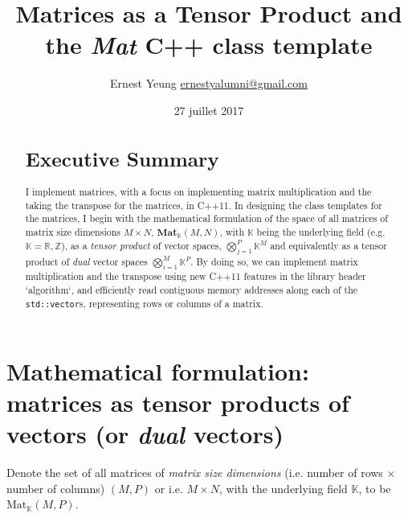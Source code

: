 \documentclass[10pt]{amsart}
\title[Matrices as a Tensor Product and the \emph{Mat} C++ class template]{Matrices as a Tensor Product and the \emph{Mat} C++ class template}
\author{Ernest Yeung \href{mailto:ernestyalumni@gmail.com}{ernestyalumni@gmail.com}}
\date{27 juillet 2017}
\begin{document}

\maketitle

\tableofcontents



 











\begin{abstract}
\section{Executive Summary}

I implement matrices, with a focus on implementing matrix multiplication and the taking the transpose for the matrices, in C++11.  In designing the class templates for the matrices, I begin with the mathematical formulation of the space of all matrices of matrix size dimensions $M\times N$, $\textbf{Mat}_{\mathbb{K}}(M,N)$, with $\mathbb{K}$ being the underlying field (e.g. $\mathbb{K}=\mathbb{R},\mathbb{Z}$), as a \emph{tensor product} of vector spaces,  $\bigotimes_{j=1}^P \mathbb{K}^M$ and equivalently as a tensor product of \emph{dual} vector spaces $\bigotimes_{i=1}^M \mathbb{K}^P$.  By doing so, we can implement matrix multiplication and the transpose using new C++11 features in the library header `algorithm`, and efficiently read contiguous memory addresses along each of the \verb|std::vector|s, representing rows or columns of a matrix.  
\end{abstract}

\section{Mathematical formulation: matrices as tensor products of vectors (or \emph{dual} vectors)}

Denote the set of all matrices of \emph{matrix size dimensions} (i.e. number of rows $\times $ number of columns) $(M,P)$ or i.e. $M\times N$, with the underlying field $\mathbb{K}$, to be $\text{Mat}_{\mathbb{K}}(M,P)$.  
\end{document}
